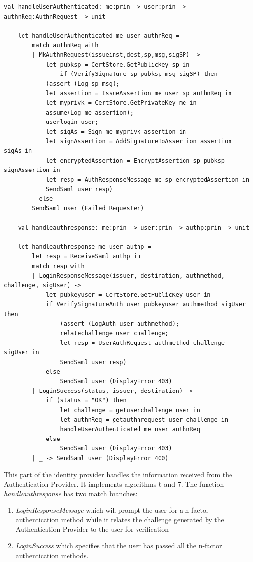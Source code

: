 \documentclass[twosided]{report}
\begin{document}
\clearpage
\begin{lstlisting}[style=fstar, caption={The handling of the responses from Authentication Provider}]
	val handleUserAuthenticated: me:prin -> user:prin -> authnReq:AuthnRequest -> unit

	let handleUserAuthenticated me user authnReq = 
		match authnReq with
		| MkAuthnRequest(issueinst,dest,sp,msg,sigSP) ->
			let pubksp = CertStore.GetPublicKey sp in
				if (VerifySignature sp pubksp msg sigSP) then
			(assert (Log sp msg);
			let assertion = IssueAssertion me user sp authnReq in
			let myprivk = CertStore.GetPrivateKey me in
			assume(Log me assertion);
			userlogin user;
			let sigAs = Sign me myprivk assertion in
			let signAssertion = AddSignatureToAssertion assertion sigAs in
			let encryptedAssertion = EncryptAssertion sp pubksp signAssertion in
			let resp = AuthResponseMessage me sp encryptedAssertion in
			SendSaml user resp)
	      else
		SendSaml user (Failed Requester)

	val handleauthresponse: me:prin -> user:prin -> authp:prin -> unit

	let handleauthresponse me user authp =
		let resp = ReceiveSaml authp in
		match resp with
		| LoginResponseMessage(issuer, destination, authmethod, challenge, sigUser) ->
			let pubkeyuser = CertStore.GetPublicKey user in
			if VerifySignatureAuth user pubkeyuser authmethod sigUser then
				(assert (LogAuth user authmethod);
				relatechallenge user challenge;
				let resp = UserAuthRequest authmethod challenge sigUser in
				SendSaml user resp)
			else
				SendSaml user (DisplayError 403)
		| LoginSuccess(status, issuer, destination) ->
			if (status = "OK") then
				let challenge = getuserchallenge user in
				let authnReq = getauthnrequest user challenge in
				handleUserAuthenticated me user authnReq
			else 
				SendSaml user (DisplayError 403)
		| _ -> SendSaml user (DisplayError 400)
\end{lstlisting}

This part of the identity provider handles the information received from the Authentication Provider. It implements algorithms 6 and 7. The function \emph{handleauthresponse} has two match branches:
\clearpage
\begin{enumerate}
\item \emph{LoginResponseMessage} which will prompt the user for a n-factor authentication method while it relates the challenge generated by the Authentication Provider to the user for verification
\item \emph{LoginSuccess} which specifies that the user has passed all the n-factor authentication methods. 
\end{enumerate}
\end{document}
